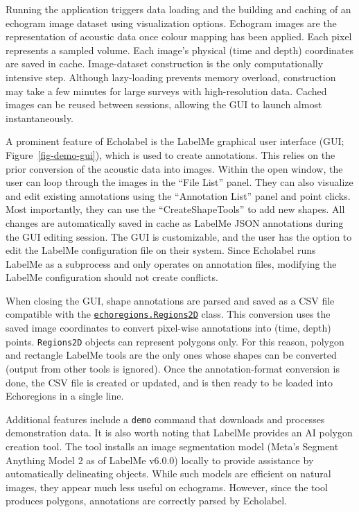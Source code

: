 \documentclass[
  number,
  preprint,
  3p]{elsarticle}
\begin{document}
Running the application triggers data loading and the building and
caching of an echogram image dataset using visualization options.
Echogram images are the representation of acoustic data once colour
mapping has been applied. Each pixel represents a sampled volume. Each
image's physical (time and depth) coordinates are saved in cache.
Image-dataset construction is the only computationally intensive step.
Although lazy-loading prevents memory overload, construction may take a
few minutes for large surveys with high-resolution data. Cached images
can be reused between sessions, allowing the GUI to launch almost
instantaneously.

A prominent feature of Echolabel is the LabelMe graphical user interface
(GUI; Figure~\ref{fig-demo-gui}), which is used to create annotations.
This relies on the prior conversion of the acoustic data into images.
Within the open window, the user can loop through the images in the
``File List'' panel. They can also visualize and edit existing
annotations using the ``Annotation List'' panel and point clicks. Most
importantly, they can use the ``CreateShapeTools'' to add new shapes.
All changes are automatically saved in cache as LabelMe JSON annotations
during the GUI editing session. The GUI is customizable, and the user
has the option to edit the LabelMe configuration file on their system.
Since Echolabel runs LabelMe as a subprocess and only operates on
annotation files, modifying the LabelMe configuration should not create
conflicts.

When closing the GUI, shape annotations are parsed and saved as a CSV
file compatible with the
\href{https://github.com/echostack-org/echoregions/blob/main/echoregions/regions2d/regions2d.py}{\texttt{echoregions.Regions2D}}
class. This conversion uses the saved image coordinates to convert
pixel-wise annotations into (time, depth) points. \texttt{Regions2D}
objects can represent polygons only. For this reason, polygon and
rectangle LabelMe tools are the only ones whose shapes can be converted
(output from other tools is ignored). Once the annotation-format
conversion is done, the CSV file is created or updated, and is then
ready to be loaded into Echoregions in a single line.

Additional features include a \texttt{demo} command that downloads and
processes demonstration data. It is also worth noting that LabelMe
provides an AI polygon creation tool. The tool installs an image
segmentation model (Meta's Segment Anything Model 2 as of LabelMe
v6.0.0) locally to provide assistance by automatically delineating
objects. While such models are efficient on natural images, they appear
much less useful on echograms. However, since the tool produces
polygons, annotations are correctly parsed by Echolabel.
\end{document}
